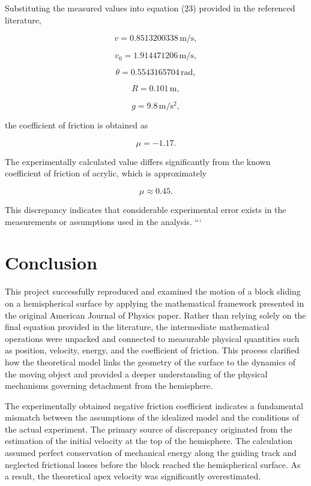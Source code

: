 \documentclass[11pt,letterpaper]{article}
\begin{document}
Substituting the measured values into equation (23) provided in the referenced literature,

\[
v = 0.8513200338\,\mathrm{m/s},
\]

\[
v_0 = 1.914471206\,\mathrm{m/s},
\]

\[
\theta = 0.5543165704\,\mathrm{rad},
\]

\[
R = 0.101\,\mathrm{m},
\]

\[
g = 9.8\,\mathrm{m/s^2},
\]

the coefficient of friction is obtained as

\[
\mu = -1.17.
\]

The experimentally calculated value differs significantly from the known coefficient of friction of acrylic, which is approximately

\[
\mu \approx 0.45.
\]

This discrepancy indicates that considerable experimental error exists in the measurements or assumptions used in the analysis.
```


\section{Conclusion}

This project successfully reproduced and examined the motion of a block sliding on a hemispherical surface by applying the mathematical framework presented in the original American Journal of Physics paper. Rather than relying solely on the final equation provided in the literature, the intermediate mathematical operations were unpacked and connected to measurable physical quantities such as position, velocity, energy, and the coefficient of friction. This process clarified how the theoretical model links the geometry of the surface to the dynamics of the moving object and provided a deeper understanding of the physical mechanisms governing detachment from the hemisphere.

The experimentally obtained negative friction coefficient indicates a fundamental mismatch between the assumptions of the idealized model and the conditions of the actual experiment. The primary source of discrepancy originated from the estimation of the initial velocity at the top of the hemisphere. The calculation assumed perfect conservation of mechanical energy along the guiding track and neglected frictional losses before the block reached the hemispherical surface. As a result, the theoretical apex velocity was significantly overestimated.
\end{document}
